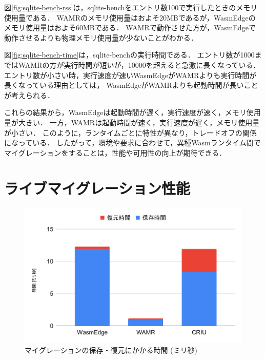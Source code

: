図\ref{fig:sqlite-bench-rss}は，sqlite-benchをエントリ数100で実行したときのメモリ使用量である．
WAMRのメモリ使用量はおよそ20MBであるが，WasmEdgeのメモリ使用量はおよそ60MBである．
WAMRで動作させた方が，WasmEdgeで動作させるよりも物理メモリ使用量が少ないことがわかる．

図\ref{fig:sqlite-bench-time}は，sqlite-benchの実行時間である．
エントリ数が1000まではWAMRの方が実行時間が短いが，10000を超えると急激に長くなっている．
エントリ数が小さい時，実行速度が速いWasmEdgeがWAMRよりも実行時間が長くなっている理由としては，
WasmEdgeがWAMRよりも起動時間が長いことが考えられる．

これらの結果から，WasmEdgeは起動時間が遅く，実行速度が速く，メモリ使用量が大きい．
一方，WAMRは起動時間が速く，実行速度が遅く，メモリ使用量が小さい．
このように，ランタイムごとに特性が異なり，トレードオフの関係になっている．
したがって，環境や要求に合わせて，異種Wasmランタイム間でマイグレーションをすることは，性能や可用性の向上が期待できる．

\section{ライブマイグレーション性能}
\begin{figure}[t]
    \centering
    \includegraphics*[width=1\linewidth]{images/migration-perf}
    \caption{マイグレーションの保存・復元にかかる時間 (ミリ秒)}
    \label{fig:migration-performance}
\end{figure}

